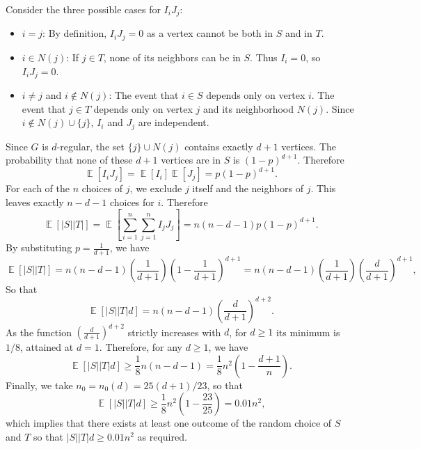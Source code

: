 \documentclass[12pt]{article}
\DeclareMathOperator{\E}{\mathbb{E}}
\begin{document}
Consider the three possible cases for $I_iJ_j$:
\begin{itemize}
    \item $i = j$: By definition, $I_i J_j = 0$ as a vertex cannot be both in $S$ and in $T$.
    \item $i \in N(j)$: If $j \in T$, none of its neighbors can be in $S$. Thus $I_i = 0$, so $I_i J_j = 0$.
    \item $i \neq j$ and $i \notin N(j)$: The event that $i \in S$ depends only on vertex $i$. The event that $j \in T$ depends only on vertex $j$ and its neighborhood $N(j)$. Since $i \notin N(j) \cup \{j\}$, $I_i$ and $J_j$ are independent.
\end{itemize}
Since $G$ is $d$-regular, the set $\{j\} \cup N(j)$ contains exactly $d+1$ vertices. The probability that none of these $d+1$ vertices are in $S$ is $(1-p)^{d+1}$. Therefore$$\E[I_i J_j]=\E[I_i]\E[J_j] = p(1-p)^{d+1}.$$
For each of the $n$ choices of $j$, we exclude $j$ itself and the neighbors of $j$. This leaves exactly $n - d - 1$ choices for $i$. Therefore $$\E[|S||T|]=\E\left[\sum_{i=1}^n\sum_{j=1}^nI_jJ_j\right]=n(n - d - 1)p(1-p)^{d+1}.$$
By substituting $p = \frac{1}{d+1}$, we have
$$\E[|S||T|] = n(n - d - 1) \left(\frac{1}{d+1}\right) \left(1 - \frac{1}{d+1}\right)^{d+1} = n(n - d - 1) \left(\frac{1}{d+1}\right) \left(\frac{d}{d+1}\right)^{d+1},$$
So that $$\E[|S||T|d] = n(n - d - 1) \left(\frac{d}{d+1}\right)^{d+2}.$$
As the function $\left(\frac{d}{d+1}\right)^{d+2}$ strictly increases with $d$, for $d\ge 1$ its minimum is $1/8$, attained at $d=1$.
Therefore, for any $d \ge 1$, we have $$\E[|S||T|d] \ge \frac 1 8 n(n - d - 1) = \frac 1 8 n^2 \left(1 - \frac{d+1}{n}\right).$$
Finally, we take $n_0=n_0(d) = 25(d+1)/23$, so that $$\E[|S||T|d] \ge \frac 1 8 n^2 \left(1 - \frac{23}{25}\right)=0.01n^2,$$ which implies that there exists at least one outcome of the random choice of $S$ and $T$ so that $|S||T|d\ge0.01n^2$ as required.
\end{document}
